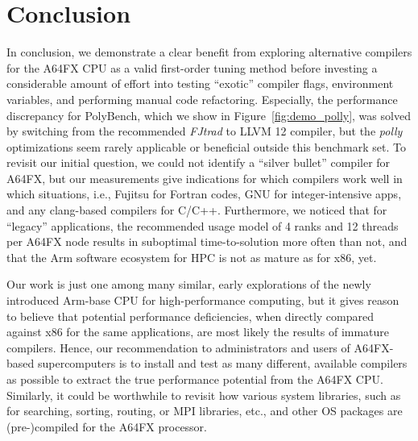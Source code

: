 \documentclass[conference,compsoc]{IEEEtran}
\begin{document}




\section{Conclusion}\label{sec:concl}
In conclusion, we demonstrate a clear benefit from exploring alternative compilers for the A64FX CPU as a valid first-order
tuning method before investing a considerable amount of effort into testing ``exotic'' compiler flags, environment variables, and
performing manual code refactoring.
Especially, the performance discrepancy for PolyBench, which we show in Figure~\ref{fig:demo_polly}, was
solved by switching from the recommended \textit{FJtrad} to LLVM 12 compiler, but the \textit{polly}
optimizations seem rarely applicable or beneficial outside this benchmark set.
To revisit our initial question,
we could not identify a ``silver bullet'' compiler for A64FX, but our measurements give indications
for which compilers work well in which situations, i.e., Fujitsu for Fortran codes, GNU for integer-intensive
apps, and any clang-based compilers for C/C++. Furthermore, we noticed that for ``legacy'' applications, the
recommended usage model of 4 ranks and 12 threads per A64FX node results in suboptimal time-to-solution
more often than not, and that the Arm software ecosystem for HPC is not as mature as for x86, yet.

Our work is just one among many similar, early explorations of the newly introduced Arm-base CPU
for high-performance computing, but it gives reason to believe that potential performance deficiencies, when
directly compared against x86 for the same applications, are most likely the results of immature compilers.
Hence, our recommendation to administrators and users of A64FX-based supercomputers is to install and test as
many different, available compilers as possible to extract the true performance potential from the
A64FX CPU. Similarly, it could be worthwhile to revisit how various system libraries, such as for searching, sorting, routing,
or MPI libraries, etc., and other OS packages are (pre-)compiled for the A64FX processor.
\end{document}
